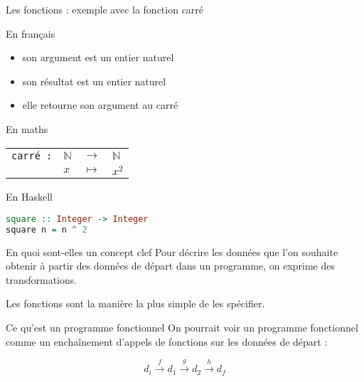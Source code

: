 \documentclass[handout]{beamer}
\begin{document}
  \begin{frame}[fragile]{Les fonctions : exemple avec la fonction carré}
   \begin{block}{En français}
    \begin{itemize}
     \item son argument est un entier naturel
     \item son résultat est un entier naturel
     \item elle retourne son argument au carré
    \end{itemize}
   \end{block}
   \pause
   \begin{block}{En maths}
    \begin{tabular}{l l l l}
     \texttt{carré :} & $\mathbb{N}$ & $\rightarrow$ & $\mathbb{N}$ \\
                      & $x$          & $\mapsto$     & $x^2$ \\
    \end{tabular}
   \end{block}
   \pause
   \begin{block}{En Haskell}
    \begin{lstlisting}[language=Haskell]
square :: Integer -> Integer
square n = n ^ 2
    \end{lstlisting}
   \end{block}
\end{frame}


  \begin{frame}{En quoi sont-elles un concept clef}
   Pour décrire les données que l'on souhaite obtenir à partir des données de
   départ dans un programme, on exprime des transformations.
   
   Les fonctions sont la manière la plus simple de les spécifier.
  \end{frame}


  \begin{frame}{Ce qu'est un programme fonctionnel}
   On pourrait voir un programme fonctionnel comme un enchaînement d'appels de
   fonctions sur les données de départ :
   
   \[
    d_i \overset{f}   {\longrightarrow}
    d_1 \overset{g}   {\longrightarrow}
    d_2 \overset{h} {\longrightarrow}
    d_f
   \]
  \end{frame}
\end{document}
